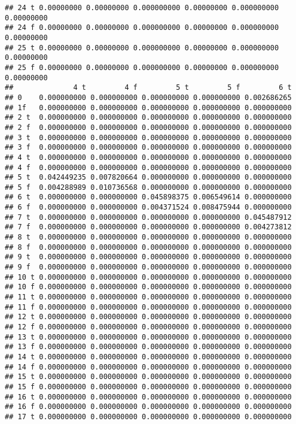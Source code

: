 \documentclass[]{article}
\begin{document}
\begin{verbatim}
## 24 t 0.00000000 0.00000000 0.000000000 0.00000000 0.000000000 0.00000000
## 24 f 0.00000000 0.00000000 0.000000000 0.00000000 0.000000000 0.00000000
## 25 t 0.00000000 0.00000000 0.000000000 0.00000000 0.000000000 0.00000000
## 25 f 0.00000000 0.00000000 0.000000000 0.00000000 0.000000000 0.00000000
##              4 t         4 f         5 t         5 f         6 t
## 0    0.000000000 0.000000000 0.000000000 0.000000000 0.002686265
## 1f   0.000000000 0.000000000 0.000000000 0.000000000 0.000000000
## 2 t  0.000000000 0.000000000 0.000000000 0.000000000 0.000000000
## 2 f  0.000000000 0.000000000 0.000000000 0.000000000 0.000000000
## 3 t  0.000000000 0.000000000 0.000000000 0.000000000 0.000000000
## 3 f  0.000000000 0.000000000 0.000000000 0.000000000 0.000000000
## 4 t  0.000000000 0.000000000 0.000000000 0.000000000 0.000000000
## 4 f  0.000000000 0.000000000 0.000000000 0.000000000 0.000000000
## 5 t  0.042449235 0.007820664 0.000000000 0.000000000 0.000000000
## 5 f  0.004288989 0.010736568 0.000000000 0.000000000 0.000000000
## 6 t  0.000000000 0.000000000 0.045898375 0.006549614 0.000000000
## 6 f  0.000000000 0.000000000 0.004371524 0.008475944 0.000000000
## 7 t  0.000000000 0.000000000 0.000000000 0.000000000 0.045487912
## 7 f  0.000000000 0.000000000 0.000000000 0.000000000 0.004273812
## 8 t  0.000000000 0.000000000 0.000000000 0.000000000 0.000000000
## 8 f  0.000000000 0.000000000 0.000000000 0.000000000 0.000000000
## 9 t  0.000000000 0.000000000 0.000000000 0.000000000 0.000000000
## 9 f  0.000000000 0.000000000 0.000000000 0.000000000 0.000000000
## 10 t 0.000000000 0.000000000 0.000000000 0.000000000 0.000000000
## 10 f 0.000000000 0.000000000 0.000000000 0.000000000 0.000000000
## 11 t 0.000000000 0.000000000 0.000000000 0.000000000 0.000000000
## 11 f 0.000000000 0.000000000 0.000000000 0.000000000 0.000000000
## 12 t 0.000000000 0.000000000 0.000000000 0.000000000 0.000000000
## 12 f 0.000000000 0.000000000 0.000000000 0.000000000 0.000000000
## 13 t 0.000000000 0.000000000 0.000000000 0.000000000 0.000000000
## 13 f 0.000000000 0.000000000 0.000000000 0.000000000 0.000000000
## 14 t 0.000000000 0.000000000 0.000000000 0.000000000 0.000000000
## 14 f 0.000000000 0.000000000 0.000000000 0.000000000 0.000000000
## 15 t 0.000000000 0.000000000 0.000000000 0.000000000 0.000000000
## 15 f 0.000000000 0.000000000 0.000000000 0.000000000 0.000000000
## 16 t 0.000000000 0.000000000 0.000000000 0.000000000 0.000000000
## 16 f 0.000000000 0.000000000 0.000000000 0.000000000 0.000000000
## 17 t 0.000000000 0.000000000 0.000000000 0.000000000 0.000000000

\end{verbatim}
\end{document}
